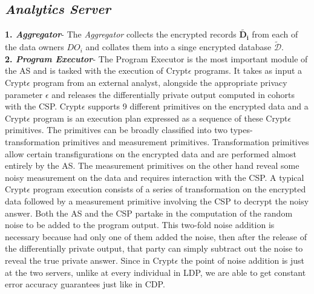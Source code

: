 \subsection*{\textit{Analytics Server}}

\textbf{1.\textit{ Aggregator}}- The \textit{Aggregator} collects the encrypted records $\mathbf{\tilde{D_i}}$ from each of the data owners $DO_i$ and collates them into a singe encrypted database $\boldsymbol{\tilde{\mathcal{D}}}$. \\\textbf{2.\textit{ Program Executor}}- The Program Executor is the most important module of the AS and is tasked with the execution of Crypt$\epsilon$ programs. It takes as input a Crypt$\epsilon$ program from an external analyst, alongside the appropriate privacy parameter $\epsilon$ and releases the differentially private output computed in cohorts with the CSP. Crypt$\epsilon$ supports 9 different primitives on the encrypted data and a Crypt$\epsilon$ program is an execution plan expressed as a sequence of these Crypt$\epsilon$ primitives. The primitives can be broadly classified into two types- transformation primitives and measurement primitives. Transformation primitives allow certain transfigurations on the encrypted data and are performed almost entirely by the AS. The measurement primitives on the other hand reveal some noisy measurement on the data and requires interaction with the CSP. A typical Crypt$\epsilon$ program execution consists of  a series of transformation on the encrypted data followed by a measurement primitive involving the CSP to decrypt the noisy answer. Both the AS and the CSP partake in the computation of the random noise to be added to the program output. This two-fold noise addition is necessary because  had only one of them added the noise, then after the release of the differentially private output, that party can simply subtract out the noise to reveal the true private answer. Since in Crypt$\epsilon$ the point of noise addition is just at the two servers, unlike at every individual in LDP, we are able to get constant error accuracy guarantees just like in CDP. 
